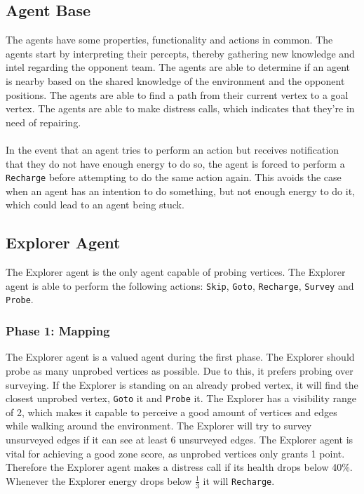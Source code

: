 \documentclass[11pt]{article}
\begin{document}
\subsection{Agent Base}
The agents have some properties, functionality and actions in common. The agents start by interpreting their percepts, thereby gathering new knowledge and intel regarding the opponent team. The agents are able to determine if an agent is nearby based on the shared knowledge of the environment and the opponent positions. The agents are able to find a path from their current vertex to a goal vertex. The agents are able to make distress calls, which indicates that they're in need of repairing.\\
\\
In the event that an agent tries to perform an action but receives notification that they do not have enough energy to do so, the agent is forced to perform a {\tt Recharge} before attempting to do the same action again. This avoids the case when an agent has an intention to do something, but not enough energy to do it, which could lead to an agent being stuck.

\subsection{Explorer Agent}
The Explorer agent is the only agent capable of probing vertices. The Explorer agent is able to perform the following actions: {\tt Skip}, {\tt Goto}, {\tt Recharge}, {\tt Survey} and {\tt Probe}.

\subsubsection*{Phase 1: Mapping}
The Explorer agent is a valued agent during the first phase. The Explorer should probe as many unprobed vertices as possible. Due to this, it prefers probing over surveying. If the Explorer is standing on an already probed vertex, it will find the closest unprobed vertex, {\tt Goto} it and {\tt Probe} it. The Explorer has a visibility range of 2, which makes it capable to perceive a good amount of vertices and edges while walking around the environment. The Explorer will try to survey unsurveyed edges if it can see at least 6 unsurveyed edges. The Explorer agent is vital for achieving a good zone score, as unprobed vertices only grants 1 point. Therefore the Explorer agent makes a distress call if its health drops below 40\%. Whenever the Explorer energy drops below $\frac{1}{3}$ it will {\tt Recharge}.
\end{document}
